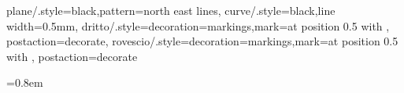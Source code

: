 \newcommand{\referenze}[2]{
	\phantomsection{}#2\textsuperscript{\textcolor{blue}{\textbf{#1}}}
}
\def\restriction#1#2{\mathchoice
              {\setbox1\hbox{${\displaystyle #1}_{\scriptstyle #2}$}
              \restrictionaux{#1}{#2}}
              {\setbox1\hbox{${\textstyle #1}_{\scriptstyle #2}$}
              \restrictionaux{#1}{#2}}
              {\setbox1\hbox{${\scriptstyle #1}_{\scriptscriptstyle #2}$}
              \restrictionaux{#1}{#2}}
              {\setbox1\hbox{${\scriptscriptstyle #1}_{\scriptscriptstyle #2}$}
              \restrictionaux{#1}{#2}}}
\def\restrictionaux#1#2{{#1\,\smash{\vrule height .8\ht1 depth .85\dp1}}_{\,#2}} 

\usepackage{tikz}
\usetikzlibrary{matrix, patterns, calc, decorations.pathreplacing, hobby, decorations.markings, decorations.pathmorphing, babel}
\usepackage{tikz-3dplot}
\usepackage{mathrsfs} %
\usepackage{tikz-cd}
\tikzset
{
  plane/.style={black,pattern=north east lines},
  curve/.style={black,line width=0.5mm},
  dritto/.style={decoration={markings,mark=at position 0.5 with {}}, postaction=decorate},
  rovescio/.style={decoration={markings,mark=at position 0.5 with {}}, postaction=decorate}
}
\usepackage{pgfplots} %
	\pgfplotsset{/pgf/number format/use comma,compat=1.15}

\usepackage[hang, perpage, symbol*, stable, bottom]{footmisc} %
\footnotemargin=0.8em
%
	\newcommand{\footnotemarkk}[1]{%
		\hyperref[#1]{\begin{NoHyper}
			\footnotemark
		\end{NoHyper}}}
	\newcommand{\consecfoottext}[3]{
		\addtocounter{footnote}{-#1}
		\footnotetext{#3\label{#2}}
		\addtocounter{footnote}{#1}
	}


